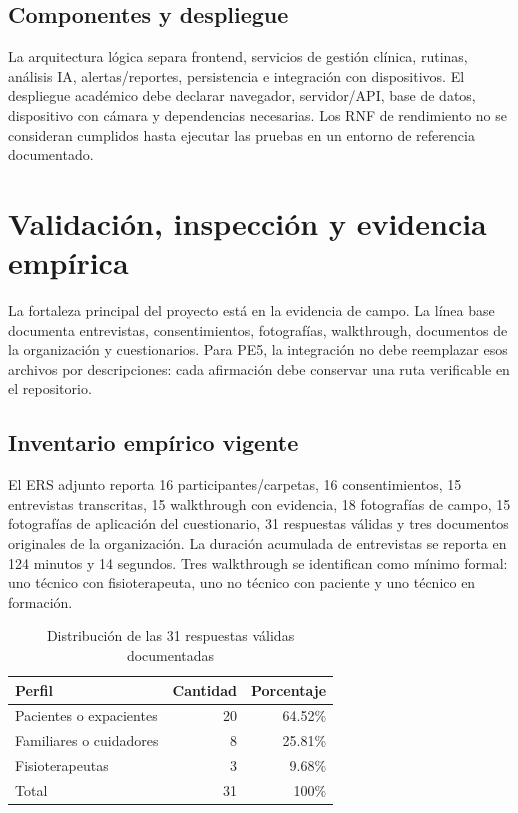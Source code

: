 \documentclass[12pt,a4paper]{article}
\begin{document}
\subsection{Componentes y despliegue}
La arquitectura lógica separa frontend, servicios de gestión clínica, rutinas, análisis IA, alertas/reportes, persistencia e integración con dispositivos. El despliegue académico debe declarar navegador, servidor/API, base de datos, dispositivo con cámara y dependencias necesarias. Los RNF de rendimiento no se consideran cumplidos hasta ejecutar las pruebas en un entorno de referencia documentado.

\section{Validación, inspección y evidencia empírica}
La fortaleza principal del proyecto está en la evidencia de campo. La línea base documenta entrevistas, consentimientos, fotografías, walkthrough, documentos de la organización y cuestionarios. Para PE5, la integración no debe reemplazar esos archivos por descripciones: cada afirmación debe conservar una ruta verificable en el repositorio.

\subsection{Inventario empírico vigente}
El ERS adjunto reporta 16 participantes/carpetas, 16 consentimientos, 15 entrevistas transcritas, 15 walkthrough con evidencia, 18 fotografías de campo, 15 fotografías de aplicación del cuestionario, 31 respuestas válidas y tres documentos originales de la organización. La duración acumulada de entrevistas se reporta en 124 minutos y 14 segundos. Tres walkthrough se identifican como mínimo formal: uno técnico con fisioterapeuta, uno no técnico con paciente y uno técnico en formación.

\begin{table}[H]\centering\caption{Distribución de las 31 respuestas válidas documentadas}\begin{tabular}{lrr}\toprule
\textbf{Perfil}&\textbf{Cantidad}&\textbf{Porcentaje}\\\midrule
Pacientes o expacientes&20&64.52\%\\
Familiares o cuidadores&8&25.81\%\\
Fisioterapeutas&3&9.68\%\\\midrule
Total&31&100\%\\\bottomrule
\end{tabular}\end{table}
\end{document}
